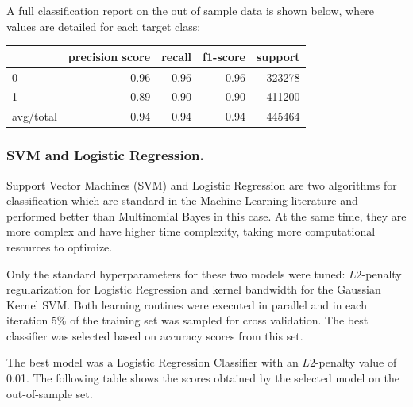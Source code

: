 A full classification report on the out of sample data is shown below, where values are detailed for each target class:
\begin{table}[ht]
	\label{tab:classification_report}
	\centering
	\begin{tabular}{ l r r r r }
		\toprule
		{ } & precision score & recall  & f1-score & support \\
		\midrule
		0 		  & 0.96 & 0.96  & 0.96 & 323278  \\
		1		  & 0.89 &  0.90 &  0.90 & 411200 \\
		avg/total & 0.94 &  0.94 &  0.94 & 445464 \\
		\bottomrule
	\end{tabular}
\end{table}


\subsubsection{SVM and Logistic Regression.}

Support Vector Machines (SVM) and Logistic Regression are two algorithms for classification which are standard in the Machine Learning literature and performed better than Multinomial Bayes in this case. 
At the same time, they are more complex and have higher time complexity, taking more computational resources to optimize.

Only the standard hyperparameters for these two models were tuned: $L2$-penalty regularization for Logistic Regression and kernel bandwidth for the Gaussian Kernel SVM.
Both learning routines were executed in parallel and in each iteration 5\% of the training set was sampled for cross validation. The best classifier was selected based on accuracy scores from this set.



The best model was a Logistic Regression Classifier with an $L2$-penalty value of 0.01. 
The following table
shows the scores obtained by the selected model on the out-of-sample set.

